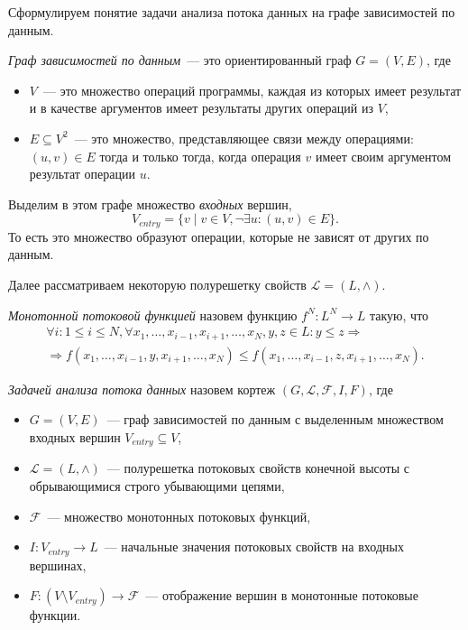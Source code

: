 \documentclass[14pt,titlepage,draft]{extarticle}
\newcommand{\Lattice}{\mathcal{L}}
\newcommand{\meet}{\wedge}
\begin{document}
    Сформулируем понятие задачи анализа потока данных на графе зависимостей по
    данным.

    \emph{Граф зависимостей по данным}~--- это ориентированный граф
    $G = (V, E)$, где
    \begin{itemize}
      \item $V$~--- это множество операций программы, каждая из которых имеет
            результат и в качестве аргументов имеет результаты других операций
            из $V$,
      \item $E \subseteq V^2$~--- это множество, представляющее связи между
            операциями: $(u, v) \in E$ тогда и только тогда, когда операция $v$
            имеет своим аргументом результат операции $u$.
    \end{itemize}

    Выделим в этом графе множество \emph{входных} вершин,
    \[ V_{entry} = \{ v \mid v \in V, \lnot \exists u\colon (u, v) \in E \}. \]
    То есть это множество образуют операции, которые не зависят от других по
    данным.

    Далее рассматриваем некоторую полурешетку свойств $\Lattice = (L, \meet)$.

    \emph{Монотонной потоковой функцией} назовем функцию $f^N \colon L^N \to L$
    такую, что
    \begin{multline*}
      \forall i\colon 1 \leq i \leq N,
      \forall x_1, \ldots, x_{i-1}, x_{i+1}, \ldots, x_N, y, z \in L \colon
        y \leq z \Rightarrow \\
        \Rightarrow
        f(x_1, \ldots, x_{i-1}, y, x_{i+1}, \ldots, x_N) \leq
        f(x_1, \ldots, x_{i-1}, z, x_{i+1}, \ldots, x_N).
    \end{multline*}

    \emph{Задачей анализа потока данных} назовем кортеж $(G, \Lattice,
    \mathcal{F}, I, F)$, где
    \begin{itemize}
      \item $G = (V, E)$~--- граф зависимостей по данным с выделенным
            множеством входных вершин $V_{entry} \subseteq V$,
      \item $\Lattice = (L, \meet)$~--- полурешетка потоковых свойств конечной
            высоты с обрывающимися строго убывающими цепями,
      \item $\mathcal{F}$~--- множество монотонных потоковых функций,
      \item $I\colon V_{entry} \to L$~--- начальные значения потоковых свойств
            на входных вершинах,
      \item $F\colon (V \setminus V_{entry}) \to \mathcal{F}$~--- отображение
            вершин в монотонные потоковые функции.
    \end{itemize}
\end{document}
